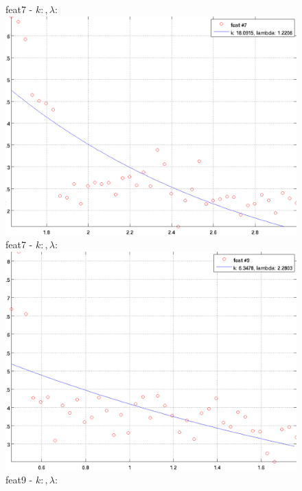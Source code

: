 \documentclass[12pt]{report}
\begin{document}
\begin{figure}
\begin{minipage}[t]{0.5\linewidth}
	\centering
	feat7 - $k: , \lambda:  $\\
	\includegraphics[scale=\imFeatScale, angle=\imFeatAngle]{images/feat7}\\
	feat7 - $k: , \lambda:  $\\
	\includegraphics[scale=\imFeatScale, angle=\imFeatAngle]{images/feat9}\\
	feat9 - $k: , \lambda:  $\\

\end{minipage}
\end{figure}
\end{document}
